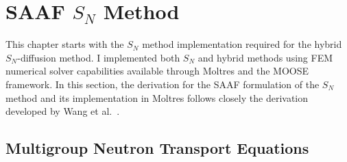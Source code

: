 
\section{\Gls{SAAF} $S_N$ Method} \label{sec:saaf}

This chapter starts with the $S_N$ method implementation required for the hybrid $S_N$-diffusion
method. I implemented both $S_N$ and hybrid methods using \gls{FEM} numerical solver capabilities
available through Moltres \cite{lindsay_moltres_2017} and the \gls{MOOSE} framework. In this
section, the derivation for the \gls{SAAF} formulation of the $S_N$ method and its
implementation in Moltres follows closely the derivation developed by Wang et al.\
\cite{wang_diffusion_2014, wang_rattlesnake_2018}.

\subsection{Multigroup Neutron Transport Equations}

